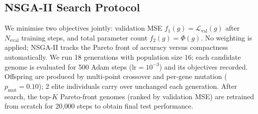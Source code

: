 \subsection{NSGA-II Search Protocol}
\label{sec:search}

We minimise two objectives jointly: validation MSE $f_1(g) = \mathcal{L}_{\mathrm{val}}(g)$ after $N_{\mathrm{eval}}$ training steps, and total parameter count $f_2(g) = \Phi(g)$.
No weighting is applied; NSGA-II tracks the Pareto front of accuracy versus compactness automatically.
We run 18 generations with population size 16; each candidate genome is evaluated for 500 Adam steps ($\mathrm{lr}=10^{-3}$) and its objectives recorded.
Offspring are produced by multi-point crossover and per-gene mutation ($p_{\mathrm{mut}}=0.10$); 2 elite individuals carry over unchanged each generation.
After search, the top-$K$ Pareto-front genomes (ranked by validation MSE) are retrained from scratch for 20{,}000 steps to obtain final test performance.
